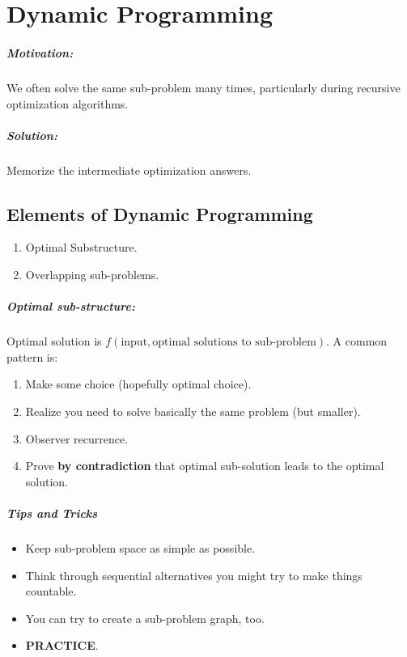 \documentclass[a4paper,12pt]{report}
\begin{document}
\chapter{Dynamic Programming}

\paragraph{Motivation: } We often solve the same sub-problem many times, particularly during recursive optimization algorithms. 

\paragraph{Solution: } Memorize the intermediate optimization answers. 

\section{Elements of Dynamic Programming}

\begin{enumerate}
\item Optimal Substructure. 
\item Overlapping sub-problems. 
\end{enumerate}

\paragraph{Optimal sub-structure: } Optimal solution is $f(\text{input}, \text{optimal solutions to sub-problem})$. A common pattern is: 
\begin{enumerate}
\item Make some choice (hopefully optimal choice).
\item Realize you need to solve basically the same problem (but smaller).
\item Observer recurrence.
\item Prove \textbf{by contradiction} that optimal sub-solution leads to the optimal solution.
\end{enumerate}

\paragraph{Tips and Tricks} 
\begin{itemize}
\item Keep sub-problem space as simple as possible. 
\item Think through sequential alternatives you might try to make things countable.
\item You can try to create a sub-problem graph, too. 
\item \textbf{PRACTICE}.
\end{itemize}
\end{document}
